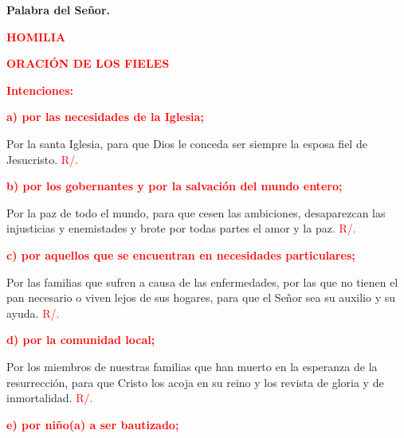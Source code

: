 \documentclass[12pt, letterpaper]{report}
\begin{document}
{\bfseries Palabra del Se\~nor.} \newline

\Large {\bfseries \textcolor{red}{HOMILIA}} \newline

\newpage

\Large {\bfseries \textcolor{red}{ORACI\'ON DE LOS FIELES}} \newline

\large {\bfseries \textcolor{red}{Intenciones:}} \newline

\large {\bfseries \textcolor{red}{a) por las necesidades de la Iglesia;}} \newline

\Large Por la santa Iglesia, para que Dios le conceda ser siempre la esposa fiel de Jesucristo. \hspace{1cm} \textcolor{red}{R/.}\newline

\large {\bfseries \textcolor{red}{b) por los gobernantes y por la salvaci\'on del mundo entero;}} \newline

\Large Por la paz de todo el mundo, para que cesen las ambiciones, desaparezcan las injusticias y enemistades y brote por todas partes el amor y la paz. \hspace{1cm} \textcolor{red}{R/.}\newline

\large {\bfseries \textcolor{red}{c) por aquellos que se encuentran en necesidades particulares;}} \newline

\Large Por las familias que sufren a causa de las enfermedades, por las que no tienen el pan necesario o viven lejos de sus hogares, para que el Se\~nor sea su auxilio y su ayuda. \hspace{1cm} \textcolor{red}{R/.}\newline

\large {\bfseries \textcolor{red}{d) por la comunidad local;}} \newline

\Large Por los miembros de nuestras familias que han muerto en la esperanza de la resurrecci\'on, para que Cristo los acoja en su reino y los revista de gloria y de inmortalidad. \hspace{1cm} \textcolor{red}{R/.}\newline

\large {\bfseries \textcolor{red}{e) por ni\~no(a) a ser bautizado;}} \newline
\end{document}
